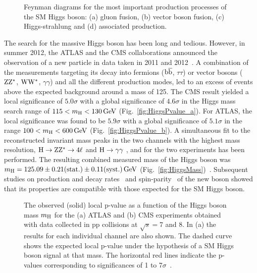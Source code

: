 \begin{figure}[!htb]
\centering
{}
\caption{Feynman diagrams for the most important production processes of the SM Higgs boson: (a) gluon fusion, (b) vector boson fusion, (c) Higgs-strahlung and (d) \ttbar associated production.}
\label{fig:HiggsProd}
\end{figure}

The search for the massive Higgs boson has been long and tedious. 
However, in summer 2012, the ATLAS and the CMS collaborations announced the observation of a new particle in data taken in 2011 and 2012~\cite{Aad:2012tfa,Chatrchyan:2013lba}.
A combination of the measurements targeting its decay into fermions (${\mathrm{b}\overline{\mathrm{b}}}$, $\tau\tau$) or vector bosons ($\mathrm{Z}\mathrm{Z}^*$, $\mathrm{W}\mathrm{W}^*$, $\gamma\gamma$) and all the different production modes, led to an excess of events above the expected background around a mass of 125\GeV.
The CMS result yielded a local significance of $5.0\sigma$ with a global significance of $4.6\sigma$ in the Higgs mass search range of $115 < m_\mathrm{H} < 130\,\text{Ge\hspace{-.08em}V}$ (Fig.~\ref{fig:HiggsPvalue_a}).
For ATLAS, the local significance was found to be $5.9\sigma$ with a global significance of $5.1\sigma$ in the range $100 < m_\mathrm{H} < 600\,\text{Ge\hspace{-.08em}V}$ (Fig.~\ref{fig:HiggsPvalue_b}).
A simultaneous fit to the reconstructed invariant mass peaks in the two channels with the highest mass resolution, $\mathrm{H} \to \mathrm{Z}\mathrm{Z}^* \to 4\ell$ and $\mathrm{H} \to \gamma\gamma$ , and for the two experiments has been performed.
The resulting combined measured mass of the Higgs boson was $m_\mathrm{H} = 125.09 \pm 0.21 \mbox{(stat.)} \pm 0.11 \mbox{(syst.)} \,\text{Ge\hspace{-.08em}V}$ (Fig.~\ref{fig:HiggsMass})~\cite{Aad:2015zhl}.
Subsequent studies on production and decay rates~\cite{Khachatryan:2016vau} and spin-parity~\cite{Aad:2015mxa,Chatrchyan:2012jja,Khachatryan:2014kca} of the new boson showed that its properties are compatible with those expected for the SM Higgs boson. 

  \begin{figure}[!htb]
  \centering
  \caption{The observed (solid) local p-value as a function of the Higgs boson mass $m_\mathrm{H}$ for the (a) ATLAS and (b) CMS experiments obtained with data collected in pp collisions at $\sqrt{s} = 7$ and 8\TeV.
  In (a) the results for each individual channel are also shown. 
  The dashed curve shows the expected local p-value under the hypothesis of a SM Higgs boson signal at that mass.
  The horizontal red lines indicate the p-values corresponding to significances of 1 to 7$\sigma$~\cite{Aad:2012tfa,Chatrchyan:2013lba}.}
  \label{fig:HiggsPvalue}
\end{figure} 


